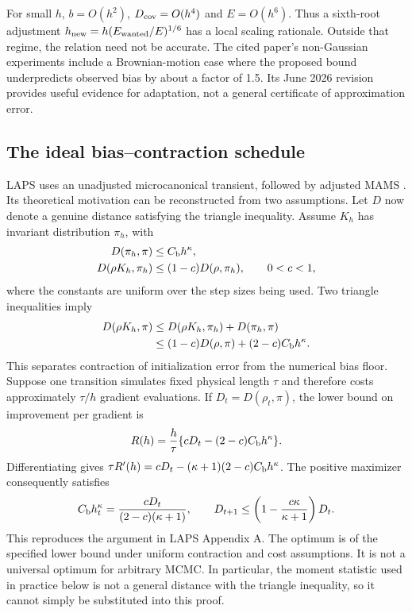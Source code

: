 For small $h$, $b=O(h^2)$, $D_{\rm cov}=O(h^4)$ and
$E=O(h^6)$. Thus a sixth-root adjustment
$h_{\rm new}=h(E_{\rm wanted}/E)^{1/6}$ has a local scaling rationale.
Outside that regime, the relation need not be accurate. The cited paper's
non-Gaussian experiments include a Brownian-motion case where the proposed
bound underpredicts observed bias by about a factor of 1.5. Its June 2026
revision provides useful evidence for adaptation, not a general certificate
of approximation error.

\subsection{The ideal bias--contraction schedule}

LAPS uses an unadjusted microcanonical transient, followed by adjusted MAMS
\citep{robnik2026laps}. Its theoretical motivation can be reconstructed from
two assumptions. Let $D$ now denote a genuine distance satisfying the
triangle inequality. Assume $K_h$ has invariant distribution $\pi_h$, with
\begin{align}
 D(\pi_h,\pi)&\leq C_{\rm b}h^\kappa,\\
 D(\rho K_h,\pi_h)&\leq(1-c)D(\rho,\pi_h),\qquad 0<c<1,
 \label{eq:bf-modern-laps-assumptions}
\end{align}
where the constants are uniform over the step sizes being used. Two triangle
inequalities imply
\begin{align}
 D(\rho K_h,\pi)
 &\leq D(\rho K_h,\pi_h)+D(\pi_h,\pi)\\
 &\leq(1-c)D(\rho,\pi)+(2-c)C_{\rm b}h^\kappa.
 \label{eq:bf-modern-laps-contraction}
\end{align}
This separates contraction of initialization error from the numerical bias
floor. Suppose one transition simulates fixed physical length $\tau$ and
therefore costs approximately $\tau/h$ gradient evaluations. If
$D_t=D(\rho_t,\pi)$, the lower bound on improvement per gradient is
\begin{equation}
 R(h)=\frac h\tau\{cD_t-(2-c)C_{\rm b}h^\kappa\}.
 \label{eq:bf-modern-laps-rate}
\end{equation}
Differentiating gives
$\tau R'(h)=cD_t-(\kappa+1)(2-c)C_{\rm b}h^\kappa$.
The positive maximizer consequently satisfies
\begin{equation}
 C_{\rm b}h_t^\kappa
   =\frac{cD_t}{(2-c)(\kappa+1)},\qquad
 D_{t+1}\leq\left(1-\frac{c\kappa}{\kappa+1}\right)D_t.
 \label{eq:bf-modern-laps-ideal-schedule}
\end{equation}
This reproduces the argument in LAPS Appendix A. The optimum is of the
specified lower bound under uniform contraction and cost assumptions. It is
not a universal optimum for arbitrary MCMC. In particular, the moment
statistic used in practice below is not a general distance with the triangle
inequality, so it cannot simply be substituted into this proof.

